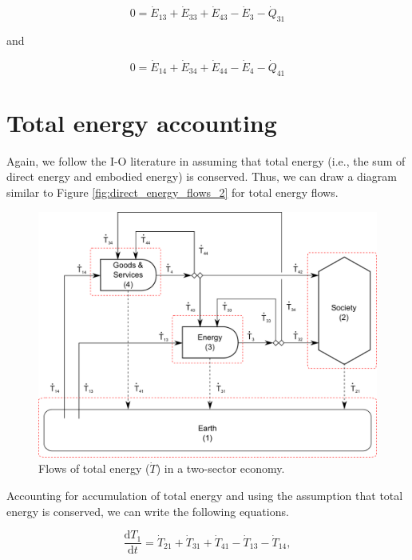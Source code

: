 \begin{equation} \label{eq:C-CV_E_dot_3_SS}
	0 = \dot{E}_{13} + \dot{E}_{33} + \dot{E}_{43} - \dot{E}_{3} - \dot{Q}_{31}
\end{equation}

\noindent and 

\begin{equation} \label{eq:C-CV_E_dot_4_SS}
	0 = \dot{E}_{14} + \dot{E}_{34} + \dot{E}_{44} - \dot{E}_4 - \dot{Q}_{41}
\end{equation}

\section{Total energy accounting}

Again, we follow the I-O literature in assuming that total energy (i.e., the sum of direct energy and embodied energy) is conserved. Thus, we can draw a diagram similar to Figure \ref{fig:direct_energy_flows_2} for total energy flows.

\begin{figure}[h!]
\includegraphics[width=1.0\linewidth]{Chapter_Example_C/images/I-O_three_sector_total_energy.pdf}
\caption{Flows of total energy ($\dot{T}$) in a two-sector economy.}
\label{fig:total_energy_flows_2S}
\end{figure}

Accounting for accumulation of total energy and using the assumption that total energy is conserved, we can write the following equations.

\begin{equation} \label{eq:C-CV_T_1}
	\frac{\mathrm{d}T_{1}}{\mathrm{d}t} 	 = \dot{T}_{21} + \dot{T}_{31} + \dot{T}_{41} - \dot{T}_{13} - \dot{T}_{14},
\end{equation}

